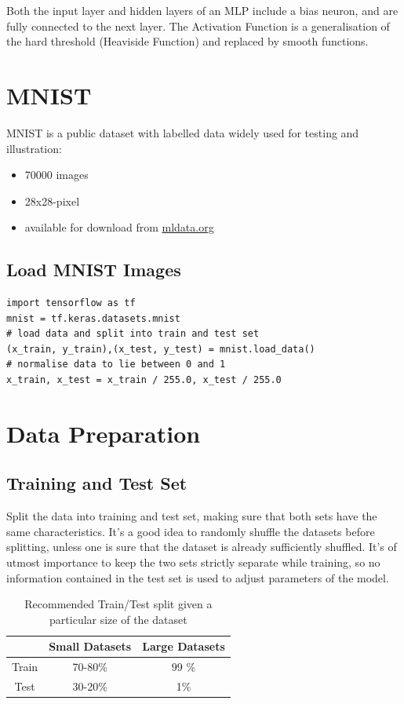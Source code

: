 \documentclass[11pt]{article}
\begin{document}
Both the input layer and hidden layers of an MLP include a bias neuron, and are fully connected to the next layer. The Activation Function is a generalisation of the hard threshold (Heaviside Function) and replaced by smooth functions.

\section{MNIST}
MNIST is a public dataset with labelled data widely used for testing and illustration:
\begin{itemize}[label=-]
	\item 70000 images
	\item 28x28-pixel
	\item available for download from \url{mldata.org}
\end{itemize}

\subsection{Load MNIST Images}

\begin{verbatim}
import tensorflow as tf
mnist = tf.keras.datasets.mnist
# load data and split into train and test set
(x_train, y_train),(x_test, y_test) = mnist.load_data()
# normalise data to lie between 0 and 1
x_train, x_test = x_train / 255.0, x_test / 255.0
\end{verbatim}

\section{Data Preparation}

\subsection{Training and Test Set}
Split the data into training and test set, making sure that both sets have the same characteristics. It's a good idea to randomly shuffle the datasets before splitting, unless one is sure that the dataset is already sufficiently shuffled. It's of utmost importance to keep the two sets strictly separate while training, so no information contained in the test set is used to adjust parameters of the model.

\begin{table}[h!]
	\centering
	\begin{tabular}{|c|c|c|}
		\hline
		&\textbf{Small Datasets}&\textbf{Large Datasets}\\
		\hline
		Train & 70-80\% & 99 \% \\
		\hline
		Test & 30-20\% & 1\%\\
		\hline
	\end{tabular}
	\caption{Recommended Train/Test split given a particular size of the dataset}
\end{table}
\end{document}

